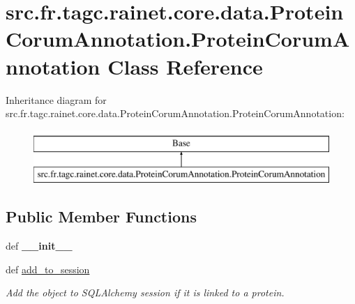 \hypertarget{classsrc_1_1fr_1_1tagc_1_1rainet_1_1core_1_1data_1_1ProteinCorumAnnotation_1_1ProteinCorumAnnotation}{\section{src.\-fr.\-tagc.\-rainet.\-core.\-data.\-Protein\-Corum\-Annotation.\-Protein\-Corum\-Annotation Class Reference}
\label{classsrc_1_1fr_1_1tagc_1_1rainet_1_1core_1_1data_1_1ProteinCorumAnnotation_1_1ProteinCorumAnnotation}
}
Inheritance diagram for src.\-fr.\-tagc.\-rainet.\-core.\-data.\-Protein\-Corum\-Annotation.\-Protein\-Corum\-Annotation\-:\begin{figure}[H]
\begin{center}
\leavevmode
\includegraphics[height=2.000000cm]{classsrc_1_1fr_1_1tagc_1_1rainet_1_1core_1_1data_1_1ProteinCorumAnnotation_1_1ProteinCorumAnnotation}
\end{center}
\end{figure}
\subsection*{Public Member Functions}
\begin{DoxyCompactItemize}
\item 
\hypertarget{classsrc_1_1fr_1_1tagc_1_1rainet_1_1core_1_1data_1_1ProteinCorumAnnotation_1_1ProteinCorumAnnotation_ad589ffb4498767116ad9cd3749e3c8eb}{def {\bfseries \-\_\-\-\_\-init\-\_\-\-\_\-}}\label{classsrc_1_1fr_1_1tagc_1_1rainet_1_1core_1_1data_1_1ProteinCorumAnnotation_1_1ProteinCorumAnnotation_ad589ffb4498767116ad9cd3749e3c8eb}

\item 
\hypertarget{classsrc_1_1fr_1_1tagc_1_1rainet_1_1core_1_1data_1_1ProteinCorumAnnotation_1_1ProteinCorumAnnotation_ab5463b2939793b02655ac07c920f6833}{def \hyperlink{classsrc_1_1fr_1_1tagc_1_1rainet_1_1core_1_1data_1_1ProteinCorumAnnotation_1_1ProteinCorumAnnotation_ab5463b2939793b02655ac07c920f6833}{add\-\_\-to\-\_\-session}}\label{classsrc_1_1fr_1_1tagc_1_1rainet_1_1core_1_1data_1_1ProteinCorumAnnotation_1_1ProteinCorumAnnotation_ab5463b2939793b02655ac07c920f6833}

\begin{DoxyCompactList}\small\item\em Add the object to S\-Q\-L\-Alchemy session if it is linked to a protein. \end{DoxyCompactList}\end{DoxyCompactItemize}
